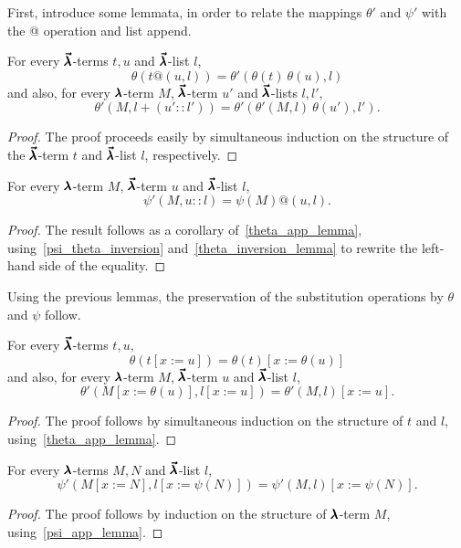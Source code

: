 First, introduce some lemmata, in order to relate the mappings $\theta'$ and $\psi'$ with the @ operation and list append.

\begin{lemma}
  \label{theta_app_lemma}
  For every $\pmb{\vec \lambda}$-terms $t, u$ and $\pmb{\vec \lambda}$-list $l$,
  \[ \theta(t@(u, l)) = \theta'(\theta(t) \ \theta(u), l) \]
  and also, for every $\pmb{\lambda}$-term $M$, $\pmb{\vec \lambda}$-term $u'$ and $\pmb{\vec \lambda}$-lists $l, l'$,
  \[ \theta'(M, l+(u'::l')) = \theta'(\theta'(M, l) \ \theta(u'), l'). \]
\end{lemma}
\begin{proof}
  The proof proceeds easily by simultaneous induction on the structure of the $\pmb{\vec \lambda}$-term $t$ and $\pmb{\vec \lambda}$-list $l$, respectively.
\end{proof}

\begin{corollary}
  \label{psi_app_lemma}
  For every $\pmb{\lambda}$-term $M$, $\pmb{\vec \lambda}$-term $u$ and $\pmb{\vec \lambda}$-list $l$,
  \[ \psi'(M, u :: l) = \psi(M)@(u, l). \]
\end{corollary}
\begin{proof}
  The result follows as a corollary of~\cref{theta_app_lemma}, using~\cref{psi_theta_inversion} and~\cref{theta_inversion_lemma} to rewrite the left-hand side of the equality.
\end{proof}

Using the previous lemmas, the preservation of the substitution operations by $\theta$ and $\psi$ follow.

\begin{lemma}
  \label{theta_subst_lemma}
  For every $\pmb{\vec \lambda}$-terms $t, u$,
  \[ \theta(t[x := u]) = \theta(t)[x := \theta(u)] \]
  and also, for every $\pmb{\lambda}$-term $M$,  $\pmb{\vec \lambda}$-term $u$ and $\pmb{\vec \lambda}$-list $l$,
  \[ \theta'(M[x := \theta(u)], l[x := u]) = \theta'(M, l)[x := u]. \]
\end{lemma}
\begin{proof}
  The proof follows by simultaneous induction on the structure of $t$ and $l$, using~\cref{theta_app_lemma}.
\end{proof}
  
\begin{lemma}
  \label{psi_subst_lemma}
  For every $\pmb{\lambda}$-terms $M, N$ and $\pmb{\vec \lambda}$-list $l$,
  \[ \psi'(M[x := N], l[x := \psi(N)]) = \psi'(M, l)[x := \psi(N)]. \]
\end{lemma}
\begin{proof}
  The proof follows by induction on the structure of $\pmb{\lambda}$-term $M$, using~\cref{psi_app_lemma}.
\end{proof}

